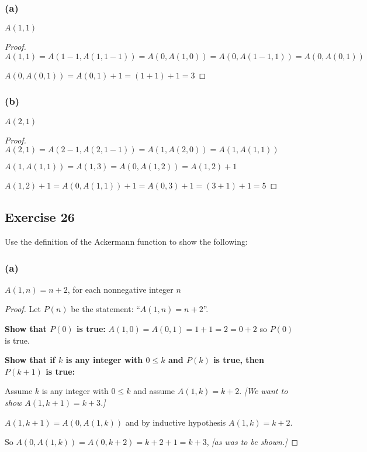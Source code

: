 \documentclass[14pt]{extarticle}
\begin{document}
\subsubsection{(a)}
$A(1, 1)$

\begin{proof}
    \(A(1, 1) = A(1-1, A(1, 1-1)) = A(0, A(1, 0)) = A(0, A(1-1, 1)) = A(0, A(0, 1))\)

    \(A(0, A(0, 1)) = A(0, 1) + 1 = (1 + 1) + 1 = 3\)
\end{proof}

\subsubsection{(b)}
$A(2, 1)$

\begin{proof}
    \(A(2, 1) = A(2-1, A(2, 1-1)) = A(1, A(2, 0)) = A(1, A(1, 1))\)

    \(A(1, A(1, 1)) = A(1, 3) = A(0, A(1, 2)) = A(1, 2) + 1\)

    \(A(1, 2) + 1 = A(0, A(1, 1)) + 1 = A(0, 3) + 1 = (3 + 1) + 1 = 5\)
\end{proof}

\subsection{Exercise 26}
Use the definition of the Ackermann function to show the following:

\subsubsection{(a)}
\(A(1, n) = n + 2\), for each nonnegative integer $n$

\begin{proof}
    Let $P(n)$ be the statement: ``\(A(1, n) = n + 2\)''.

    {\bf Show that $P(0)$ is true:} \(A(1, 0) = A(0, 1) = 1 + 1 = 2 = 0 + 2\) so $P(0)$ is true.

        {\bf Show that if $k$ is any integer with \(0 \leq k\) and $P(k)$ is true, then $P(k+1)$ is true:}

    Assume $k$ is any integer with \(0 \leq k\) and assume \(A(1, k) = k + 2\). {\it [We want to show \(A(1, k+1) = k+3\).]}

    \(A(1, k+1) = A(0, A(1, k))\) and by inductive hypothesis \(A(1, k) = k+2\).

    So \(A(0, A(1, k)) = A(0, k+2) = k+2+1 = k+3\), {\it [as was to be shown.]}
\end{proof}
\end{document}
